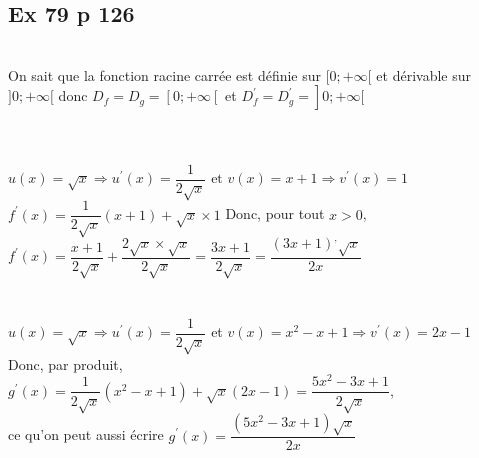 \documentclass[12pt,a4paper]{book}
\begin{document}
\subsection*{Ex 79 p 126}
\begin{enumMet}
    \item {}\\
    On sait que la fonction racine carrée est définie sur $[0 ;+\infty[$ et dérivable sur $] 0 ;+\infty[$ donc $D_{f}=D_{g}=\left[0 ;+\infty\left[\right.\right.$ et $\left.\left.D_{f}^{\prime}=D_{g}^{\prime}=\right] 0 ;+\infty[\right.$
    \item {}\\
    \\
$u(x)=\sqrt{x} \Rightarrow u^{\prime}(x)=\dfrac{1}{2 \sqrt{x}} \text { et } v(x)=x+1 \Rightarrow v^{\prime}(x)=1$\\
$f^{\prime}(x)=\dfrac{1}{2 \sqrt{x}}(x+1)+\sqrt{x} \times 1$
Donc, pour tout $x>0$,\\
$f^{\prime}(x)=\dfrac{x+1}{2 \sqrt{x}}+\dfrac{2 \sqrt{x} \times \sqrt{x}}{2 \sqrt{x}}=\dfrac{3 x+1}{2 \sqrt{x}}=\dfrac{(3 x+1)^{,} \sqrt{x}}{2 x}$\\
\ \\
\\
$u(x)=\sqrt{x} \Rightarrow u^{\prime}(x)=\dfrac{1}{2 \sqrt{x}}$ et $v(x)=x^{2}-x+1 \Rightarrow v^{\prime}(x)=2 x-1$\\
Donc, par produit,\\
$g^{\prime}(x)=\dfrac{1}{2 \sqrt{x}}\left(x^{2}-x+1\right)+\sqrt{x}(2 x-1)=\dfrac{5 x^{2}-3 x+1}{2 \sqrt{x}}$,\\
ce qu'on peut aussi écrire
$g^{\prime}(x)=\dfrac{\left(5 x^{2}-3 x+1\right) \sqrt{x}}{2 x}$
\end{enumMet}
\end{document}
